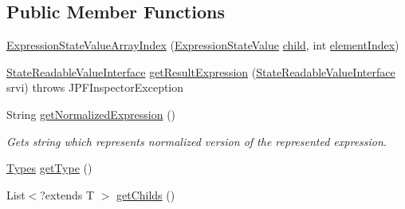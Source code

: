 \subsection*{Public Member Functions}
\begin{DoxyCompactItemize}
\item 
\hyperlink{classgov_1_1nasa_1_1jpf_1_1inspector_1_1server_1_1expression_1_1expressions_1_1_expression_state_value_array_index_a5ac3f70e12817db3dd7ce682764534ca}{Expression\+State\+Value\+Array\+Index} (\hyperlink{classgov_1_1nasa_1_1jpf_1_1inspector_1_1server_1_1expression_1_1expressions_1_1_expression_state_value}{Expression\+State\+Value} \hyperlink{classgov_1_1nasa_1_1jpf_1_1inspector_1_1server_1_1expression_1_1_expression_state_unary_operator_a66041b1f569a361549e28a00f7ca5f2f}{child}, int \hyperlink{classgov_1_1nasa_1_1jpf_1_1inspector_1_1server_1_1expression_1_1expressions_1_1_expression_state_value_array_index_a90a2553f285ebf96b2572a89b99ec148}{element\+Index})
\item 
\hyperlink{interfacegov_1_1nasa_1_1jpf_1_1inspector_1_1server_1_1programstate_1_1_state_readable_value_interface}{State\+Readable\+Value\+Interface} \hyperlink{classgov_1_1nasa_1_1jpf_1_1inspector_1_1server_1_1expression_1_1expressions_1_1_expression_state_value_array_index_a9f0ee794d9704a37689dc6c87eea8261}{get\+Result\+Expression} (\hyperlink{interfacegov_1_1nasa_1_1jpf_1_1inspector_1_1server_1_1programstate_1_1_state_readable_value_interface}{State\+Readable\+Value\+Interface} srvi)  throws J\+P\+F\+Inspector\+Exception 
\item 
String \hyperlink{classgov_1_1nasa_1_1jpf_1_1inspector_1_1server_1_1expression_1_1expressions_1_1_expression_state_value_array_index_ad72611ba9e78fb2d724ad26d437600a9}{get\+Normalized\+Expression} ()
\begin{DoxyCompactList}\small\item\em Gets string which represents normalized version of the represented expression. \end{DoxyCompactList}\item 
\hyperlink{enumgov_1_1nasa_1_1jpf_1_1inspector_1_1server_1_1expression_1_1_types}{Types} \hyperlink{classgov_1_1nasa_1_1jpf_1_1inspector_1_1server_1_1expression_1_1expressions_1_1_expression_state_value_a9317f49f60c166a2f46f90702e75f22e}{get\+Type} ()
\item 
List$<$?extends T $>$ \hyperlink{classgov_1_1nasa_1_1jpf_1_1inspector_1_1server_1_1expression_1_1_expression_state_unary_operator_ad010bcb9c4e2eb584321b5ceba8e1682}{get\+Childs} ()
\end{DoxyCompactItemize}
